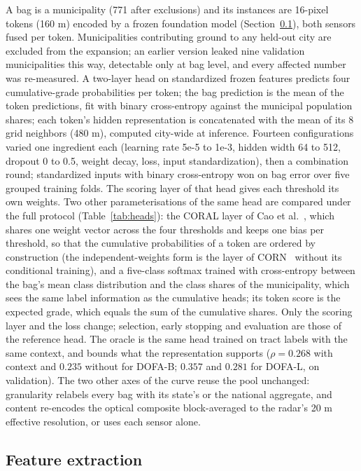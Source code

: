 \documentclass[11pt]{article}
\begin{document}
A bag is a municipality (771 after exclusions) and its instances are 16-pixel tokens
(160 m) encoded by a frozen foundation model (Section~\ref{sec:features}), both sensors
fused per token. Municipalities contributing ground to any held-out city are excluded from
the expansion; an earlier version leaked nine validation municipalities this way,
detectable only at bag level, and every affected number was re-measured. A two-layer
head on standardized frozen features predicts four cumulative-grade probabilities per
token; the bag prediction is the mean of the token predictions, fit with binary
cross-entropy against the municipal population shares; each token's hidden
representation is concatenated with the mean of its 8 grid neighbors (480 m),
computed city-wide at inference. Fourteen configurations varied one ingredient each
(learning rate 5e-5 to 1e-3, hidden width 64 to 512, dropout 0 to 0.5, weight decay,
loss, input standardization), then a combination round; standardized inputs with binary
cross-entropy won on bag error over five grouped training folds. The scoring layer of
that head gives each threshold its own weights. Two other parameterisations of the same
head are compared under the full protocol (Table~\ref{tab:heads}): the CORAL layer of Cao et
al.~\cite{cao2020coral}, which shares one weight vector across the four thresholds and
keeps one bias per threshold, so that the cumulative probabilities of a token are
ordered by construction (the independent-weights form is the layer of CORN~\cite{shi2023corn}
without its conditional training), and a five-class softmax trained with cross-entropy
between the bag's mean class distribution and the class shares of the municipality,
which sees the same label information as the cumulative heads; its token score is the
expected grade, which equals the sum of the cumulative shares. Only the scoring layer
and the loss change; selection, early stopping and evaluation are those of the reference
head. The oracle is the same
head trained on tract labels with the same context, and bounds what the representation
supports ($\rho = 0.268$ with context and $0.235$ without for DOFA-B; $0.357$ and
$0.281$ for DOFA-L, on validation). The two other axes of the
curve reuse the pool unchanged: granularity relabels every bag with its state's or the
national aggregate, and content re-encodes the optical composite block-averaged to the
radar's 20 m effective resolution, or uses each sensor alone.

\subsection{Feature extraction}
\label{sec:features}
\end{document}
